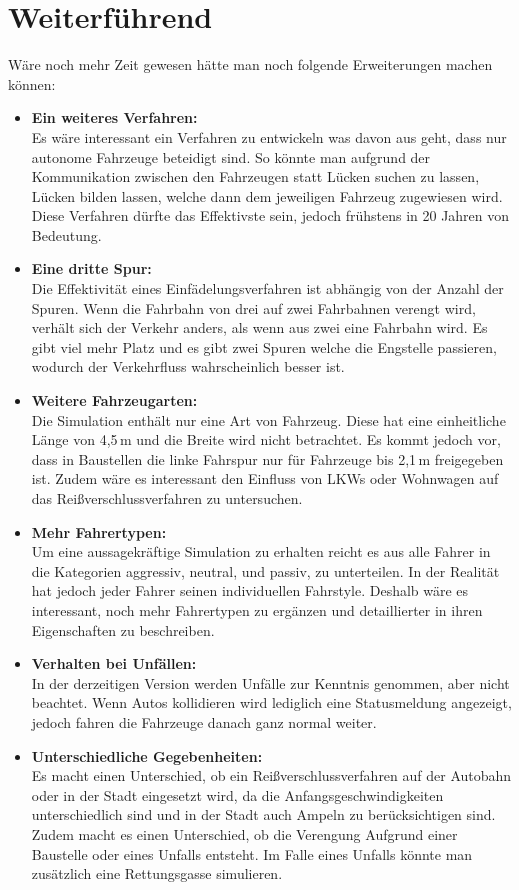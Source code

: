 \chapter{Weiterführend}
Wäre noch mehr Zeit gewesen hätte man noch folgende Erweiterungen machen können:
\begin{itemize}
	\item \textbf{Ein weiteres Verfahren:}\\
	Es wäre interessant ein Verfahren zu entwickeln was davon aus geht, dass nur autonome Fahrzeuge beteidigt sind. So könnte man aufgrund der Kommunikation zwischen den Fahrzeugen statt Lücken suchen zu lassen, Lücken bilden lassen, welche dann dem jeweiligen Fahrzeug zugewiesen wird. Diese Verfahren dürfte das Effektivste sein, jedoch frühstens in 20 Jahren von Bedeutung.
	
	\item \textbf{Eine dritte Spur:}\\
	Die Effektivität eines Einfädelungsverfahren ist abhängig von der Anzahl der Spuren. Wenn die Fahrbahn von drei auf zwei Fahrbahnen verengt wird, verhält sich der Verkehr anders, als wenn aus zwei eine Fahrbahn wird. Es gibt viel mehr Platz und es gibt zwei Spuren welche die Engstelle passieren, wodurch der Verkehrfluss wahrscheinlich besser ist.
	
	\item \textbf{Weitere Fahrzeugarten:}\\
	Die Simulation enthält nur eine Art von Fahrzeug. Diese hat eine einheitliche Länge von 4,5\,m und die Breite wird nicht betrachtet. Es kommt jedoch vor, dass in Baustellen die linke Fahrspur nur für Fahrzeuge bis 2,1\,m freigegeben ist.
	Zudem wäre es interessant den Einfluss von LKWs oder Wohnwagen auf das Reißverschlussverfahren zu untersuchen.
	
	\item \textbf{Mehr Fahrertypen:}\\
	Um eine aussagekräftige Simulation zu erhalten reicht es aus alle Fahrer in die Kategorien aggressiv, neutral, und passiv, zu unterteilen. In der Realität hat jedoch jeder Fahrer seinen individuellen Fahrstyle. Deshalb wäre es interessant, noch mehr Fahrertypen zu ergänzen und detaillierter in ihren Eigenschaften zu beschreiben.
	
	\item \textbf{Verhalten bei Unfällen:}\\
	In der derzeitigen Version werden Unfälle zur Kenntnis genommen, aber nicht beachtet. Wenn Autos kollidieren wird lediglich eine Statusmeldung angezeigt, jedoch fahren die Fahrzeuge danach ganz normal weiter.
	
	\item \textbf{Unterschiedliche Gegebenheiten:}\\
	Es macht einen Unterschied, ob ein Reißverschlussverfahren auf der Autobahn oder in der Stadt eingesetzt wird, da die Anfangsgeschwindigkeiten unterschiedlich sind und in der Stadt auch Ampeln zu berücksichtigen sind.\\
	Zudem macht es einen Unterschied, ob die Verengung Aufgrund einer Baustelle oder eines Unfalls entsteht. Im Falle eines Unfalls könnte man zusätzlich eine Rettungsgasse simulieren.
\end{itemize}